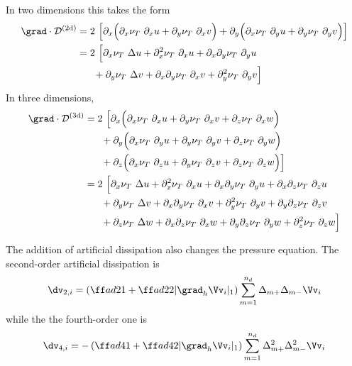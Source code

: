 In two dimensions this takes the form
\begin{align*}
   \grad\cdot{\cal D}^{\rm(2d)}
         &= 2~\Big[ \partial_x\Big( \partial_x\nuT~\partial_x u + \partial_y\nuT~\partial_x v \Big)+
                    \partial_y\Big( \partial_x\nuT~\partial_y u + \partial_y\nuT~\partial_y v \Big)
              \Big] \\
         &=2~\Big[ \partial_x\nuT~\Delta u + \partial_x^2\nuT~\partial_x u +\partial_x\partial_y\nuT~\partial_y u \\
         &~~~~~    + \partial_y\nuT~\Delta v + \partial_x\partial_y\nuT~\partial_x v+ \partial_y^2\nuT~\partial_y v
              \Big]
\end{align*}
In three dimensions,
\begin{align*}
   \grad\cdot{\cal D}^{\rm(3d)}
 &= 2~\Big[
   \partial_x\Big( \partial_x\nuT~\partial_x u+\partial_y\nuT~\partial_x v+\partial_z\nuT~\partial_x w \Big) \\
&~~~~~  +\partial_y\Big( \partial_x\nuT~\partial_y u+\partial_y\nuT~\partial_y v+\partial_z\nuT~\partial_y w \Big) \\
&~~~~~  +\partial_z\Big( \partial_x\nuT~\partial_z u+\partial_y\nuT~\partial_z v+\partial_z\nuT~\partial_z w \Big)
              \Big] \\
   &=2~\Big[ \partial_x\nuT~\Delta u + \partial_x^2\nuT~\partial_x u +\partial_x\partial_y\nuT~\partial_y u
                            +\partial_x\partial_z\nuT~\partial_z u        \\
   &~~~~~    + \partial_y\nuT~\Delta v + \partial_x\partial_y\nuT~\partial_x v+ \partial_y^2\nuT~\partial_y v
                           + \partial_y\partial_z\nuT~\partial_z v \\
   &~~~~~    + \partial_z\nuT~\Delta w + \partial_x\partial_z\nuT~\partial_x w
                           + \partial_y\partial_z\nuT~\partial_y w
                           + \partial_z^2\nuT~\partial_z w 
              \Big]
\end{align*}

\newcommand{\sgn}[1]{{\rm sgn}(#1)}

The addition of artificial dissipation also changes the pressure equation.
The second-order artificial dissipation is 
\begin{equation} 
   \dv_{2,i} =
    \left( {\ff ad21} + {\ff ad22} | \grad_h \Vv_i |_1
    \right) \sum_{m=1}^{n_d} \Delta_{m+}\Delta_{m-} \Vv_i
\end{equation}
while the the fourth-order one is
\begin{equation} 
   \dv_{4,i} =
  - \left( {\ff ad41} + {\ff ad42} | \grad_h \Vv_i |_1
    \right) \sum_{m=1}^{n_d} \Delta_{m+}^2\Delta_{m-}^2 \Vv_i
\end{equation}

